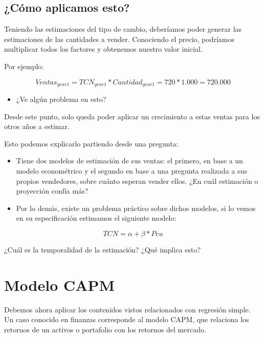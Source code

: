 \documentclass[
  letterpaper,
  DIV=11,
  numbers=noendperiod]{scrartcl}
\providecommand{\tightlist}{%
  \setlength{\itemsep}{0pt}\setlength{\parskip}{0pt}}\usepackage{longtable,booktabs,array}
\begin{document}
\subsection{¿Cómo aplicamos esto?}\label{cuxf3mo-aplicamos-esto}

Teniendo las estimaciones del tipo de cambio, deberíamos poder generar
las estimaciones de las cantidades a vender. Conociendo el precio,
podríamos multiplicar todos los factores y obtenemos nuestro valor
inicial.

Por ejemplo:

\begin{equation}
Ventas_{year 1} = TCN_{year 1} * Cantidad_{year 1} = 720 * 1.000 = 720.000
\end{equation}

\begin{itemize}
\tightlist
\item
  ¿Ve algún problema en esto?
\end{itemize}

Desde este punto, solo queda poder aplicar un crecimiento a estas ventas
para los otros años a estimar.

Esto podemos explicarlo partiendo desde una pregunta:

\begin{itemize}
\item
  Tiene dos modelos de estimación de sus ventas: el primero, en base a
  un modelo econométrico y el segundo en base a una pregunta realizada a
  sus propios vendedores, sobre cuánto esperan vender ellos. ¿En cuál
  estimación o proyección confía más?
\item
  Por lo demás, existe un problema práctico sobre dichos modelos, si lo
  vemos en su especificación estimamos el siguiente modelo:
\end{itemize}

\begin{equation}
TCN = \alpha + \beta * Pcu
\end{equation}

¿Cuál es la temporalidad de la estimación? ¿Qué implica esto?

\section{Modelo CAPM}\label{modelo-capm}

Debemos ahora aplicar los contenidos vistos relacionados con regresión
simple. Un caso conocido en finanzas corresponde al modelo CAPM, que
relaciona los retornos de un activos o portafolio con los retornos del
mercado.
\end{document}
